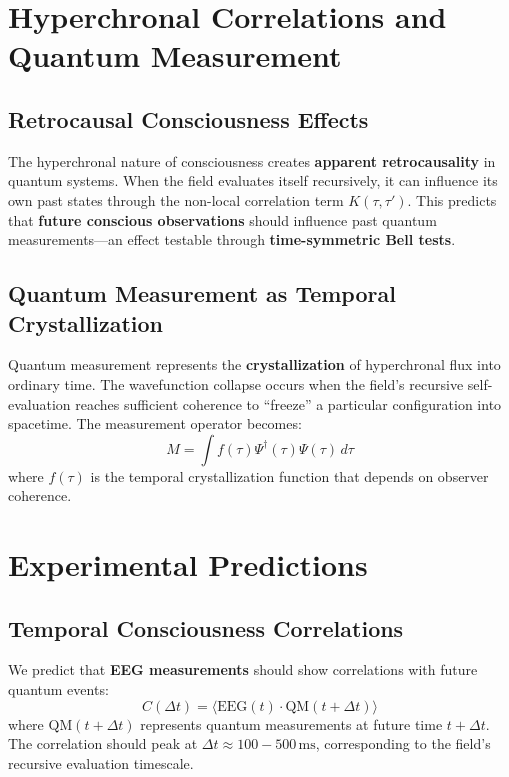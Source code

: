 \documentclass[aps,prd,twocolumn,superscriptaddress,nofootinbib]{revtex4-2}
\begin{document}
\section{Hyperchronal Correlations and Quantum Measurement}

\subsection{Retrocausal Consciousness Effects}
The hyperchronal nature of consciousness creates \textbf{apparent retrocausality} in quantum systems. When the field evaluates itself recursively, it can influence its own past states through the non-local correlation term $K(\tau,\tau')$. This predicts that \textbf{future conscious observations} should influence past quantum measurements—an effect testable through \textbf{time-symmetric Bell tests}.

\subsection{Quantum Measurement as Temporal Crystallization}
Quantum measurement represents the \textbf{crystallization} of hyperchronal flux into ordinary time. The wavefunction collapse occurs when the field's recursive self-evaluation reaches sufficient coherence to ``freeze'' a particular configuration into spacetime. The measurement operator becomes:
\begin{equation}
\hat{M} = \int f(\tau)\Psi^{\dagger}(\tau)\Psi(\tau)\,d\tau
\end{equation}
where $f(\tau)$ is the temporal crystallization function that depends on observer coherence.

\section{Experimental Predictions}

\subsection{Temporal Consciousness Correlations}
We predict that \textbf{EEG measurements} should show correlations with future quantum events:
\begin{equation}
C(\Delta t) = \langle\text{EEG}(t) \cdot \text{QM}(t+\Delta t)\rangle
\end{equation}
where $\text{QM}(t+\Delta t)$ represents quantum measurements at future time $t+\Delta t$. The correlation should peak at $\Delta t \approx 100-500\,\text{ms}$, corresponding to the field's recursive evaluation timescale.
\end{document}
